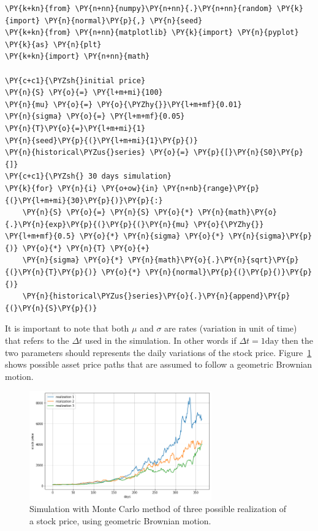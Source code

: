 \begin{tcolorbox}[breakable, size=fbox, boxrule=1pt, pad at break*=1mm,colback=cellbackground, colframe=cellborder]
\begin{Verbatim}[commandchars=\\\{\}]
\PY{k+kn}{from} \PY{n+nn}{numpy}\PY{n+nn}{.}\PY{n+nn}{random} \PY{k}{import} \PY{n}{normal}\PY{p}{,} \PY{n}{seed} 
\PY{k+kn}{from} \PY{n+nn}{matplotlib} \PY{k}{import} \PY{n}{pyplot} \PY{k}{as} \PY{n}{plt} 
\PY{k+kn}{import} \PY{n+nn}{math}
	
\PY{c+c1}{\PYZsh{}initial price}
\PY{n}{S} \PY{o}{=} \PY{l+m+mi}{100}
\PY{n}{mu} \PY{o}{=} \PY{o}{\PYZhy{}}\PY{l+m+mf}{0.01} 
\PY{n}{sigma} \PY{o}{=} \PY{l+m+mf}{0.05} 
\PY{n}{T}\PY{o}{=}\PY{l+m+mi}{1}
\PY{n}{seed}\PY{p}{(}\PY{l+m+mi}{1}\PY{p}{)} 
\PY{n}{historical\PYZus{}series} \PY{o}{=} \PY{p}{[}\PY{n}{S0}\PY{p}{]}
\PY{c+c1}{\PYZsh{} 30 days simulation}
\PY{k}{for} \PY{n}{i} \PY{o+ow}{in} \PY{n+nb}{range}\PY{p}{(}\PY{l+m+mi}{30}\PY{p}{)}\PY{p}{:}
    \PY{n}{S} \PY{o}{=} \PY{n}{S} \PY{o}{*} \PY{n}{math}\PY{o}{.}\PY{n}{exp}\PY{p}{(}\PY{p}{(}\PY{n}{mu} \PY{o}{\PYZhy{}} \PY{l+m+mf}{0.5} \PY{o}{*} \PY{n}{sigma} \PY{o}{*} \PY{n}{sigma}\PY{p}{)} \PY{o}{*} \PY{n}{T} \PY{o}{+}
	\PY{n}{sigma} \PY{o}{*} \PY{n}{math}\PY{o}{.}\PY{n}{sqrt}\PY{p}{(}\PY{n}{T}\PY{p}{)} \PY{o}{*} \PY{n}{normal}\PY{p}{(}\PY{p}{)}\PY{p}{)}
	\PY{n}{historical\PYZus{}series}\PY{o}{.}\PY{n}{append}\PY{p}{(}\PY{n}{S}\PY{p}{)}
\end{Verbatim}
\end{tcolorbox}
It is important to note that both $\mu$ and $\sigma$ are rates (variation in unit of time) 
that refers to the $\Delta t$ used in the simulation. In other words if $\Delta t = 1\textrm{day}$
then the two parameters should represents the daily variations of the stock price.
Figure~\ref{fig:stock_price_sim} shows possible asset price paths that are assumed to
follow a geometric Brownian motion. 

\begin{figure}[htb]
	\centering
	\includegraphics[width=0.7\textwidth]{figures/asset_price_simulation.png}
	\caption{Simulation with Monte Carlo method of three possible realization of a stock price, using geometric Brownian motion.}
	\label{fig:stock_price_sim}
\end{figure}

